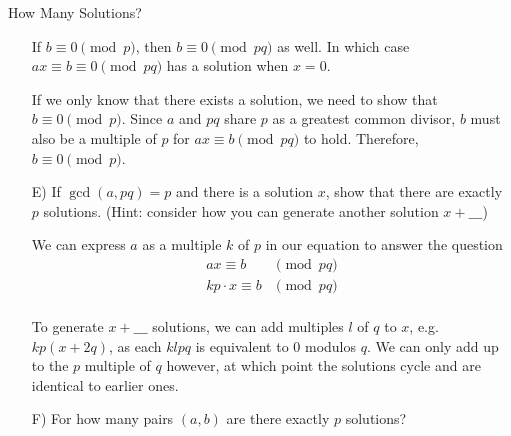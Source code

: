 \begin{homeworkProblem}{How Many Solutions?}
\begin{itemize}
        If $b \equiv 0 \pmod{p}$, then $b \equiv 0 \pmod{pq}$ as well. In which 
        case $ax \equiv b \equiv 0 \pmod{pq}$ has a solution when $x = 0$. 

        If we only know that there exists a solution, we need to show that $b
        \equiv 0 \pmod{p}$. Since $a$ and $pq$ share $p$ as a greatest common 
        divisor, $b$ must also be a multiple of $p$ for $ax \equiv b \pmod{pq}$ 
        to hold. Therefore, $b \equiv 0 \pmod{p}$.


        \item[E)] If $\gcd(a, pq) = p$ and there is a solution $x$, show that there
        are exactly $p$ solutions. (Hint: consider how you can generate another solution
        $x + \_\_\_$)

        We can express $a$ as a multiple $k$ of $p$ in our equation to answer
        the question
        \[
            \begin{split}
                ax \equiv b & \pmod{pq} \\
                kp \cdot x \equiv b & \pmod{pq} \\
            \end{split} 
        \]

        To generate $x + \_\_\_$ solutions, we can add multiples $l$ of $q$ to 
        $x$, e.g. $kp(x + 2q)$, as each $klpq$ is equivalent to 0 modulos $q$. 
        We can only add up to the $p$ multiple of $q$ however, at which point 
        the solutions cycle and are identical to earlier ones.  

        \item[F)] For how many pairs $(a,b)$ are there exactly $p$ solutions? 
        

\end{itemize}
\end{homeworkProblem}
